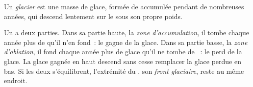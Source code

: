 \begin{definition}[Glacier]\label{def:g8:ice-on-earth:glacier}
Un \emph{glacier} est une masse de glace, formée de  accumulée pendant
de nombreuses années, qui descend lentement sur le  sous son propre
poids.
\end{definition}

Un  a deux parties. Dans sa partie haute, la \emph{zone d'accumulation},
il tombe chaque année plus de  qu'il n'en fond~: le  gagne de
la glace. Dans sa partie basse, la \emph{zone d'ablation}, il fond chaque
année plus de glace qu'il ne tombe de ~: le  perd de la glace.
La glace gagnée en haut descend sans cesse remplacer la glace perdue en
bas. Si les deux s'équilibrent, l'extrémité du , son
\emph{front glaciaire}, reste au même endroit.

